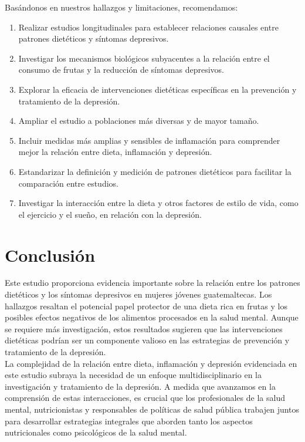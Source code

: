 \documentclass[stu, 12pt]{apa7}
\begin{document}
	Basándonos en nuestros hallazgos y limitaciones, recomendamos:
	\begin{enumerate}
		\item Realizar estudios longitudinales para establecer relaciones causales entre patrones dietéticos y síntomas depresivos.
		\item Investigar los mecanismos biológicos subyacentes a la relación entre el consumo de frutas y la reducción de síntomas depresivos.
		\item Explorar la eficacia de intervenciones dietéticas específicas en la prevención y tratamiento de la depresión.
		\item Ampliar el estudio a poblaciones más diversas y de mayor tamaño.
		\item Incluir medidas más amplias y sensibles de inflamación para comprender mejor la relación entre dieta, inflamación y depresión.
		\item Estandarizar la definición y medición de patrones dietéticos para facilitar la comparación entre estudios.
		\item Investigar la interacción entre la dieta y otros factores de estilo de vida, como el ejercicio y el sueño, en relación con la depresión.
	\end{enumerate}


	\section{Conclusión}\label{conclusiuxf3n}

	Este estudio proporciona evidencia importante sobre la relación entre
	los patrones dietéticos y los síntomas depresivos en mujeres jóvenes
	guatemaltecas. Los hallazgos resaltan el potencial papel protector de
	una dieta rica en frutas y los posibles efectos negativos de los
	alimentos procesados en la salud mental. Aunque se requiere más
	investigación, estos resultados sugieren que las intervenciones
	dietéticas podrían ser un componente valioso en las estrategias de
	prevención y tratamiento de la depresión.\\

	La complejidad de la relación entre dieta, inflamación y depresión
	evidenciada en este estudio subraya la necesidad de un enfoque
	multidisciplinario en la investigación y tratamiento de la depresión. A
	medida que avanzamos en la comprensión de estas interacciones, es
	crucial que los profesionales de la salud mental, nutricionistas y
	responsables de políticas de salud pública trabajen juntos para
	desarrollar estrategias integrales que aborden tanto los aspectos
	nutricionales como psicológicos de la salud mental.


	\nocite{*}
	\printbibliography
\end{document}
